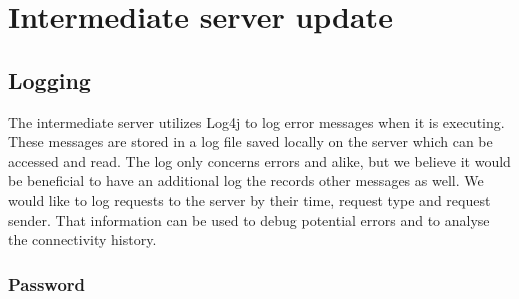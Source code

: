\section{Intermediate server update}

\subsection*{Logging}
The intermediate server utilizes Log4j \cite{log4j} to log error messages when it is executing. These messages are stored in a log file saved locally on the server which can be accessed and read. The log only concerns errors and alike, but we believe it would be beneficial to have an additional log the records other messages as well. We would like to log requests to the server by their time, request type and request sender. That information can be used to debug potential errors and to analyse the connectivity history. 

\subsubsection*{Password}


